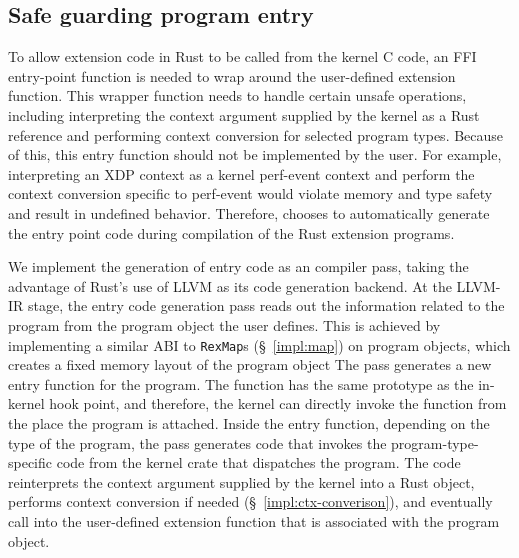\subsection{Safe guarding program entry}
To allow \projname{} extension code in Rust to be called from the kernel C
    code, an FFI entry-point function is needed to wrap around the user-defined
    extension function.
This wrapper function needs to handle certain unsafe operations, including
    interpreting the context argument supplied by the kernel as a Rust
    reference and performing context conversion for selected program types.
Because of this, this entry function should not be implemented by the user.
For example, interpreting an XDP context as a kernel perf-event context and
    perform the context conversion specific to perf-event would violate memory
    and type safety and result in undefined behavior.
Therefore, \projname{} chooses to automatically generate the entry point code
    during compilation of the Rust extension programs.

We implement the generation of entry code as an compiler pass, taking the
    advantage of Rust's use of LLVM as its code generation backend.
At the LLVM-IR stage, the entry code generation pass reads out the information
    related to the program from the program object the user defines.
This is achieved by implementing a similar ABI to \texttt{RexMap}s
    (\S~\ref{impl:map}) on program objects, which creates a fixed memory layout
    of the program object
The pass generates a new entry function for the program.
The function has the same prototype as the in-kernel hook point, and therefore,
    the kernel can directly invoke the function from the place the program is
    attached.
Inside the entry function, depending on the type of the program, the pass
    generates code that invokes the program-type-specific code from the
    \projname{} kernel crate that dispatches the program.
The code reinterprets the context argument supplied by the kernel into a Rust
    object, performs context conversion if needed
    (\S~\ref{impl:ctx-converison}), and eventually call into the
    user-defined extension function that is associated with the \projname{}
    program object.

